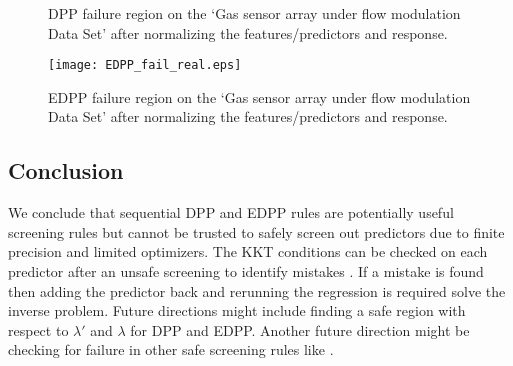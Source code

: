 \documentclass{article}
\begin{document}
\begin{figure}
    \centering
    \qquad
    \caption{DPP failure region on the `Gas sensor array under flow modulation Data Set' \cite{bioinspired} after normalizing the features/predictors and response.}
	\label{fig:DPP_fail_real}
\end{figure}

\begin{figure}
    \centering
    {\texttt{[image: EDPP\_fail\_real.eps]} }
    \caption{EDPP failure region on the `Gas sensor array under flow modulation Data Set' \cite{bioinspired} after normalizing the features/predictors and response.}
	\label{fig:EDPP_fail_real}
\end{figure}

\subsection*{Conclusion}
We conclude that sequential DPP and EDPP rules are potentially useful screening rules but cannot be trusted to safely screen out predictors due to finite precision and limited optimizers. The KKT conditions can be checked on each predictor after an unsafe screening to identify mistakes \cite{strong}. If a mistake is found then adding the predictor back and rerunning the regression is required solve the inverse problem. Future directions might include finding a safe region with respect to $\lambda'$ and $\lambda$ for DPP and EDPP. Another future direction might be checking for failure in other safe screening rules like \cite{safe}.



\end{document}
